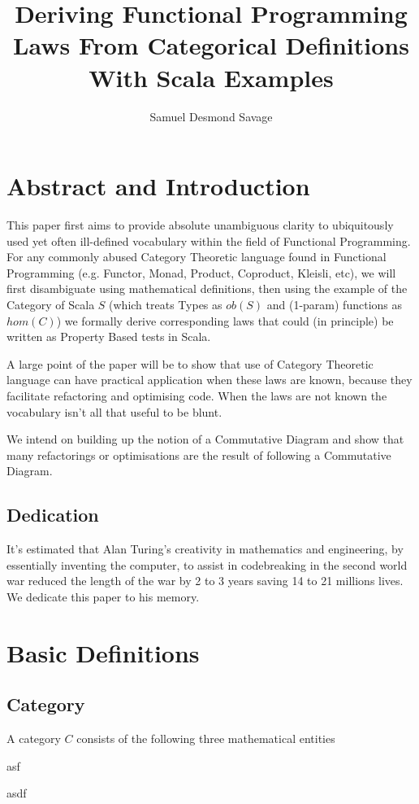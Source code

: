 \documentclass[9pt]{article} %
\title{\bf{Deriving Functional Programming Laws From Categorical Definitions With Scala Examples}}
\author{Samuel Desmond Savage}
\begin{document}
\maketitle
\tableofcontents

\newpage 

\section{Abstract and Introduction}

This paper first aims to provide absolute unambiguous clarity to ubiquitously used yet often ill-defined vocabulary within the field of Functional Programming.  For any commonly abused Category Theoretic language found in Functional Programming (e.g. Functor, Monad, Product, Coproduct, Kleisli, etc), we will first disambiguate using mathematical definitions, then using the example of the Category of Scala $S$ (which treats Types as $ob(S)$ and (1-param) functions as $hom(C)$) we formally derive corresponding laws that could (in principle) be written as Property Based tests in Scala.

A large point of the paper will be to show that use of Category Theoretic language can have practical application when these laws are known, because they facilitate refactoring and optimising code. When the laws are not known the vocabulary isn't all that useful to be blunt.

We intend on building up the notion of a Commutative Diagram and show that many refactorings or optimisations are the result of following a Commutative Diagram.

\subsection{Dedication}

It's estimated that Alan Turing's creativity in mathematics and engineering, by essentially inventing the computer, to assist in codebreaking in the second world war reduced the length of the war by 2 to 3 years saving 14 to 21 millions lives.  We dedicate this paper to his memory.

\section{Basic Definitions}

\subsection{Category}

A category $C$ consists of the following three mathematical entities


asf



asdf
\end{document}
